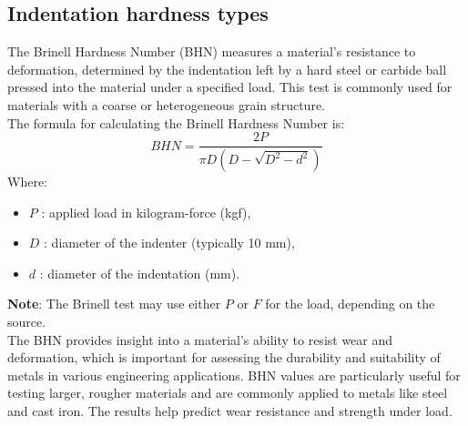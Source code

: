 \documentclass{article}
\begin{document}
\subsection{Indentation hardness types}
The Brinell Hardness Number (BHN) measures a material's resistance to deformation, determined by the indentation left by a hard steel or carbide ball pressed into the material under a specified load. This test is commonly used for materials with a coarse or heterogeneous grain structure.\\[1em]
The formula for calculating the Brinell Hardness Number is:
\begin{equation}
    BHN = \frac{2P}{\pi D (D - \sqrt{D^2 - d^2})}
\end{equation}
Where:
\begin{itemize}[itemsep=-1mm]
    \item \( P \) : applied load in kilogram-force (kgf),
    \item \( D \) : diameter of the indenter (typically 10 mm),
    \item \( d \) : diameter of the indentation (mm).
\end{itemize}
\textbf{Note}: The Brinell test may use either $P$ or $F$ for the load, depending on the source.\\ 
The BHN provides insight into a material's ability to resist wear and deformation, which is important for assessing the durability and suitability of metals in various engineering applications. BHN values are particularly useful for testing larger, rougher materials and are commonly applied to metals like steel and cast iron. The results help predict wear resistance and strength under load.
\end{document}
